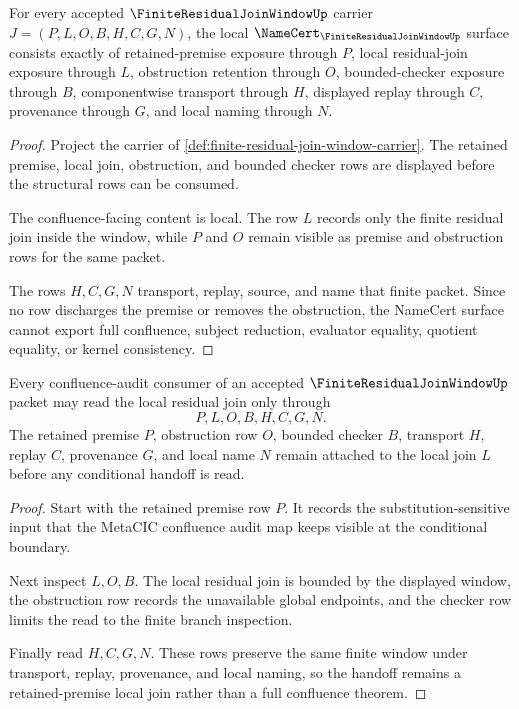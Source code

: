 \begin{theorem}
\label{thm:finite-residual-join-window-namecert-obligations}
For every accepted $\FiniteResidualJoinWindowUp$ carrier $J=(P,L,O,B,H,C,G,N)$, the local $\NameCert_{\FiniteResidualJoinWindowUp}$ surface consists exactly of retained-premise exposure through $P$, local residual-join exposure through $L$, obstruction retention through $O$, bounded-checker exposure through $B$, componentwise transport through $H$, displayed replay through $C$, provenance through $G$, and local naming through $N$.
\end{theorem}
\begin{proof}
Project the carrier of \autoref{def:finite-residual-join-window-carrier}. The retained premise, local join, obstruction, and bounded checker rows are displayed before the structural rows can be consumed.

The confluence-facing content is local. The row $L$ records only the finite residual join inside the window, while $P$ and $O$ remain visible as premise and obstruction rows for the same packet.

The rows $H,C,G,N$ transport, replay, source, and name that finite packet. Since no row discharges the premise or removes the obstruction, the NameCert surface cannot export full confluence, subject reduction, evaluator equality, quotient equality, or kernel consistency.
\end{proof}

\begin{theorem}
\label{thm:finite-residual-join-window-conditional-route}
Every confluence-audit consumer of an accepted $\FiniteResidualJoinWindowUp$ packet may read the local residual join only through
$$
P,L,O,B,H,C,G,N .
$$
The retained premise $P$, obstruction row $O$, bounded checker $B$, transport $H$, replay $C$, provenance $G$, and local name $N$ remain attached to the local join $L$ before any conditional handoff is read.
\end{theorem}
\begin{proof}
Start with the retained premise row $P$. It records the substitution-sensitive input that the MetaCIC confluence audit map keeps visible at the conditional boundary.

Next inspect $L,O,B$. The local residual join is bounded by the displayed window, the obstruction row records the unavailable global endpoints, and the checker row limits the read to the finite branch inspection.

Finally read $H,C,G,N$. These rows preserve the same finite window under transport, replay, provenance, and local naming, so the handoff remains a retained-premise local join rather than a full confluence theorem.
\end{proof}

